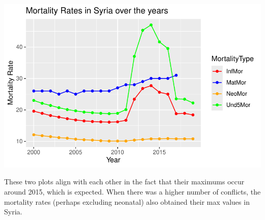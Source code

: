 \documentclass[
  11pt,
  letterpaper,
  DIV=11,
  numbers=noendperiod]{scrartcl}
\begin{document}
\includegraphics{armed_conflict_eda_files/figure-pdf/unnamed-chunk-7-2.pdf}

These two plots align with each other in the fact that their maximums
occur around 2015, which is expected. When there was a higher number of
conflicts, the mortality rates (perhaps excluding neonatal) also
obtained their max values in Syria.
\end{document}
